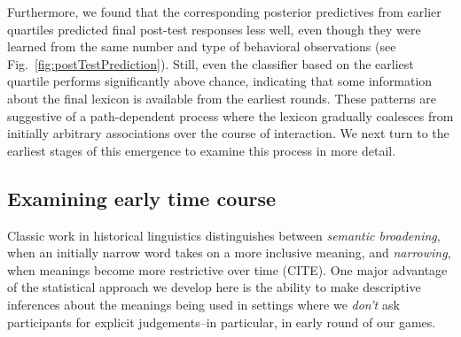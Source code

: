 \documentclass[10pt,letterpaper]{article}
\begin{document}
Furthermore, we found that the corresponding posterior predictives from earlier quartiles predicted final post-test responses less well, even though they were learned from the same number and type of behavioral observations (see Fig.\ \ref{fig:postTestPrediction}). Still, even the classifier based on the earliest quartile performs significantly above chance, indicating that some information about the final lexicon is available from the earliest rounds. These patterns are suggestive of a path-dependent process where the lexicon gradually coalesces from initially arbitrary associations over the course of interaction. We next turn to the earliest stages of this emergence to examine this process in more detail.

\subsection{Examining early time course}


Classic work in historical linguistics distinguishes between \emph{semantic broadening}, when an initially narrow word takes on a more inclusive meaning, and \emph{narrowing}, when meanings become more restrictive over time (CITE). One major advantage of the statistical approach we develop here is the ability to make descriptive inferences about the meanings being used in settings where we \emph{don't} ask participants for explicit judgements--in particular, in early round of our games. 

\end{document}
